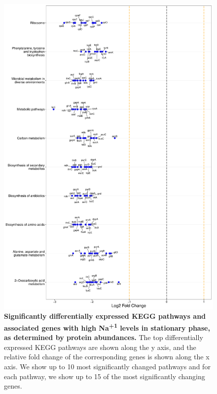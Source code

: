 \documentclass[a4paper]{article}
\begin{document}
\clearpage
\begin{figure}
	\includegraphics[width=1.0\textwidth]{../../d_figures/kegg_16.pdf}
	\caption[Significantly altered KEGG pathways for protein samples in stationary phase tested for high Na\textsuperscript{+1} against base Na\textsuperscript{+1}]
	{\textbf{Significantly differentially expressed KEGG pathways and associated genes with high Na\textsuperscript{+1} levels in stationary phase, as determined by protein abundances.} The top differentially expressed KEGG pathways are shown along the y axis, and the relative fold change of the corresponding genes is shown along the x axis. We show up to 10 most significantly changed pathways and for each pathway, we show up to 15 of the most significantly changing genes.}
\end{figure}
\clearpage
\end{document}
